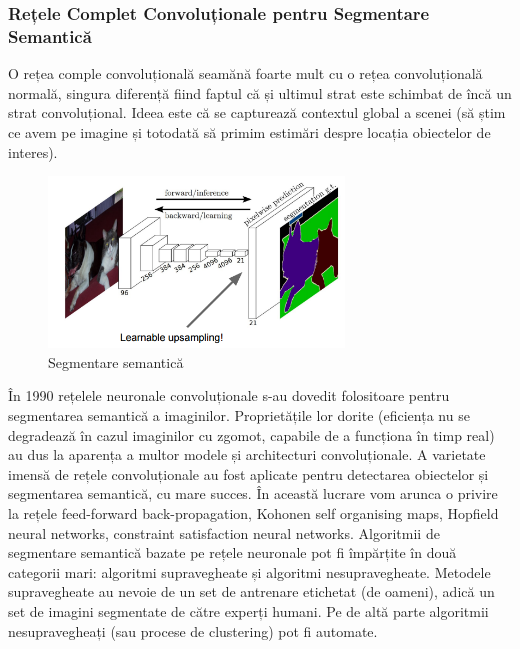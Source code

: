 \subsubsection{Rețele Complet Convoluționale pentru Segmentare Semantică}
O rețea comple convoluțională seamănă foarte mult cu o rețea convoluțională normală, singura diferență fiind faptul că și ultimul strat este schimbat de încă un strat convoluțional. Ideea este că se capturează contextul global a scenei (să știm ce avem pe imagine și totodată să primim estimări despre locația obiectelor de interes).

\begin{figure}[h!]
    	\centering
	\captionsetup{justification=centering, margin=2cm}
	\includegraphics[width=0.7\textwidth]{figures/img_seg_ful_conv.png}
	\caption{Segmentare semantică \cite{rcnn_vs_fast_rcnn}}
	\label{fig:class_detect_segment}
\end{figure}

În 1990 rețelele neuronale convoluționale s-au dovedit folositoare pentru segmentarea semantică a imaginilor. Proprietățile lor dorite (eficiența nu se degradează în cazul imaginilor cu zgomot, capabile de a funcționa în timp real) au dus la aparența a multor modele și architecturi convoluționale. A varietate imensă de rețele convoluționale au fost aplicate pentru detectarea obiectelor și segmentarea semantică, cu mare succes. În această lucrare vom arunca o privire la rețele feed-forward back-propagation, Kohonen self organising maps, Hopfield neural networks, constraint satisfaction neural networks.\newline
Algoritmii de segmentare semantică bazate pe rețele neuronale pot fi împărțite în două categorii mari: algoritmi supravegheate și algoritmi nesupravegheate. Metodele supravegheate au nevoie de un set de antrenare etichetat (de oameni), adică un set de imagini segmentate de către experți humani. Pe de altă parte algoritmii nesupravegheați (sau procese de clustering) pot fi automate.

